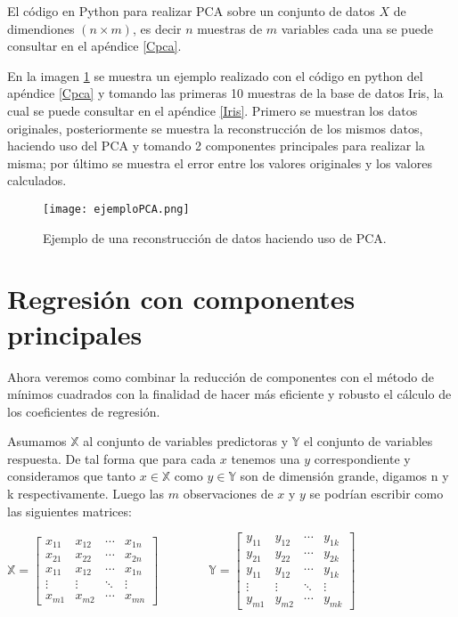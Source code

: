 El código en Python para realizar PCA sobre un conjunto de datos $X$ de dimendiones $(n \times m)$, es decir $n$ muestras de $m$ variables cada una se puede consultar en el apéndice \ref{Cpca}.

En la imagen \ref{ejemploPCA} se muestra un ejemplo realizado con el código en python del apéndice \ref{Cpca} y tomando las primeras 10 muestras de la base de datos Iris, la cual se puede consultar en el apéndice \ref{Iris}. Primero se muestran  los datos originales, posteriormente se muestra la reconstrucción de los mismos datos, haciendo uso del PCA y tomando 2 componentes principales para realizar la misma; por último se muestra el error entre los valores originales y los valores calculados. 

\begin{figure}
\centering
\texttt{[image: ejemploPCA.png]}
\caption{Ejemplo de una reconstrucción de datos haciendo uso de PCA.}\label{ejemploPCA}
\end{figure}

\section{Regresión con componentes principales}

Ahora veremos como combinar la reducción de componentes con el método de mínimos cuadrados con la finalidad de hacer más eficiente y robusto el cálculo de los coeficientes de regresión. 

Asumamos $\mathbb{X}$ al conjunto de variables predictoras y $\mathbb{Y}$ el conjunto de variables respuesta. De tal forma que para cada $x$ tenemos una $y$ correspondiente y consideramos que tanto $x \in \mathbb{X}$ como $y \in \mathbb{Y}$ son de dimensión grande, digamos n y k respectivamente. Luego las $m$ observaciones de $x$ y $y$ se podrían escribir como las siguientes matrices: 

$
\mathbb{X} =
\begin{bmatrix}
 x_{11} & x_{12} & \cdots & x_{1n} \\
 x_{21} & x_{22} & \cdots & x_{2n} \\
 x_{11} & x_{12} & \cdots & x_{1n} \\
 \vdots & \vdots & \ddots & \vdots \\
 x_{m1} & x_{m2} & \cdots & x_{mn}	
\end{bmatrix} 
\qquad\qquad
\mathbb{Y} =
\begin{bmatrix}
 y_{11} & y_{12} & \cdots & y_{1k} \\
 y_{21} & y_{22} & \cdots & y_{2k} \\
 y_{11} & y_{12} & \cdots & y_{1k} \\
 \vdots & \vdots & \ddots & \vdots \\
 y_{m1} & y_{m2} & \cdots & y_{mk}	
\end{bmatrix} $ 
 
